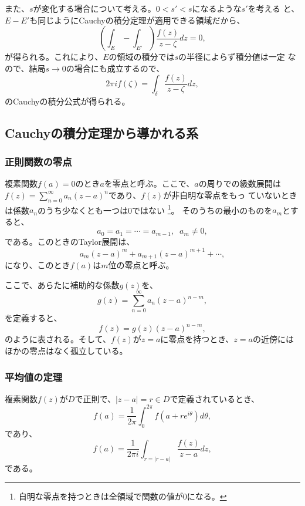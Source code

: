 また、$s$が変化する場合について考える。$0<s'<s$になるような$s'$を考える
と、$E-E'$も同じようにCauchyの積分定理が適用できる領域だから、
\begin{equation}
 \left(\int_{E}-\int_{E'}\right)\frac{f(z)}{z-\zeta}dz = 0,
\end{equation}
が得られる。これにより、$E$の領域の積分では$s$の半径によらず積分値は一定
なので、結局$s\to 0$の場合にも成立するので、
\begin{equation}
 2\pi i f(\zeta) = \int_{\delta} \frac{f(z)}{z - \zeta}dz,
\end{equation}
のCauchyの積分公式が得られる。

\subsection{Cauchyの積分定理から導かれる系}
\subsubsection{正則関数の零点}
複素関数$f(a)=0$のとき$a$を零点と呼ぶ。ここで、$a$の周りでの級数展開は
$f(z)=\sum_{n=0}^{\infty}a_n (z-a)^n$であり、$f(z)$が非自明な零点をもっ
ていないときは係数$a_n$のうち少なくとも一つは0ではない
\footnote{自明な零点を持つときは全領域で関数の値が0になる。}。
そのうちの最小のものを$a_m$とすると、
\begin{equation}
 a_0 = a_1 = \cdots = a_{m-1}, \mspace{10mu} a_m \ne 0,
\end{equation}
である。このときのTaylor展開は、
\begin{equation}
 a_m (z - a)^m + a_{m+1} (z-a)^{m+1} + \cdots,
\end{equation}
になり、このとき$f(a)$は$m$位の零点と呼ぶ。

ここで、あらたに補助的な係数$g(z)$を、
\begin{equation}
 g (z) = \sum_{n=0}^{\infty}a_n (z-a)^{n-m},
\end{equation}
を定義すると、
\begin{equation}
 f(z) = g(z) (z - a)^{n-m},
\end{equation}
のように表される。そして、$f(z)$が$z=a$に零点を持つとき、$z=a$の近傍には
ほかの零点はなく孤立している。

\subsubsection{平均値の定理}
複素関数$f(z)$が$D$で正則で、$|z-a| = r \in D$で定義されているとき、
\begin{equation}
 f(a) = \frac{1}{2\pi}\int_{0}^{2\pi}f(a+re^{i\theta})d\theta,
\end{equation}
であり、
\begin{equation}
 f(a) = \frac{1}{2\pi i}\int_{r=|r-a|}\frac{f(z)}{z-a}dz,
\end{equation}
である。

